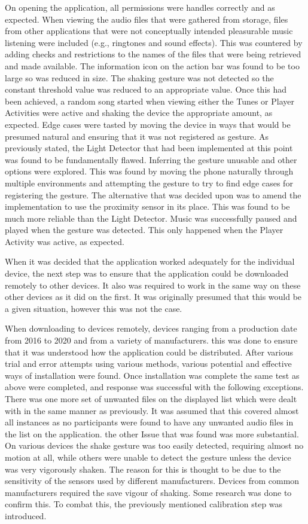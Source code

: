 \documentclass{l4proj}
\begin{document}
On opening the application, all permissions were handles correctly and as expected. When viewing the audio files that were gathered from storage, files from other applications that were not conceptually intended pleasurable music listening were included (e.g., ringtones and sound effects). This was countered by adding checks and restrictions to the names of the files that were being retrieved and made available. The information icon on the action bar was found to be too large so was reduced in size. The shaking gesture was not detected so the constant threshold value was reduced to an appropriate value. Once this had been achieved, a random song started when viewing either the Tunes or Player Activities were active and shaking the device the appropriate amount, as expected. Edge cases were tasted by moving the device in ways that would be presumed natural and ensuring that it was not registered as gesture. As previously stated, the Light Detector that had been implemented at this point was found to be fundamentally flawed. Inferring the gesture unusable and other options were explored. This was found by moving the phone naturally through multiple environments and attempting the gesture to try to find edge cases for registering the gesture. The alternative that was decided upon was to amend the implementation to use the proximity sensor in its place. This was found to be much more reliable than the Light Detector. Music was successfully paused and played when the gesture was detected. This only happened when the Player Activity was active, as expected.

When it was decided that the application worked adequately for the individual device, the next step was to ensure that the application could be downloaded remotely to other devices. It also was required to work in the same way on these other devices as it did on the first. It was originally presumed that this would be a given situation, however this was not the case.


When downloading to devices remotely, devices ranging from a production date from 2016 to 2020 and from a variety of manufacturers. this was done to ensure that it was understood how the application could be distributed. After various trial and error attempts using various methods, various potential and effective ways of installation were found. Once installation was complete the same test as above were completed, and response was successful with the following exceptions. There was one more set of unwanted files on the displayed list which were dealt with in the same manner as previously. It was assumed that this covered almost all instances as no participants were found to have any unwanted audio files in the list on the application. the other Issue that was found was more substantial. On various devices the shake gesture was too easily detected, requiring almost no motion at all, while others were unable to detect the gesture unless the device was very vigorously shaken. The reason for this is thought to be due to the sensitivity of the sensors used by different manufacturers. Devices from common manufacturers required the save vigour of shaking. Some research was done to confirm this. To combat this, the previously mentioned calibration step was introduced.
\end{document}
